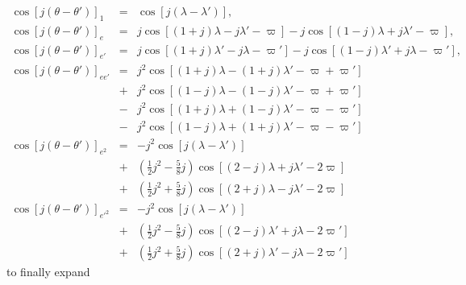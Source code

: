 \documentclass [12pt, a4paper] {article}
\begin{document}
\begin {eqnarray}
    \cos[j(\theta - \theta')]_1 
    &=&
    \cos[j(\lambda - \lambda')],
    \\
    \cos[j(\theta - \theta')]_e 
    &=&
    j\cos[(1+j)\lambda - j\lambda' - \varpi]
    -
    j\cos[(1-j)\lambda + j\lambda' - \varpi],
    \\
    \cos[j(\theta - \theta')]_{e'} 
    &=&
    j\cos[(1 + j)\lambda' - j\lambda - \varpi']
    - 
    j\cos[(1 - j)\lambda' + j\lambda - \varpi'],
    \\
    \cos[j(\theta - \theta')]_{ee'} 
    &=&
    j^2\cos[(1+j)\lambda - (1+j)\lambda' - \varpi + \varpi']
    \\\nonumber
    &+&
    j^2\cos[(1-j)\lambda - (1-j)\lambda' - \varpi + \varpi']
    \\\nonumber 
    &-&
    j^2\cos[(1+j)\lambda + (1-j)\lambda' - \varpi - \varpi']
    \\\nonumber 
    &-&
    j^2\cos[(1-j)\lambda + (1+j)\lambda' - \varpi - \varpi']
    \\
    \cos[j(\theta - \theta')]_{e^2} 
    &=&
    -j^2\cos[j(\lambda - \lambda')]
    \\\nonumber 
    &+&
    \left(\frac{1}{2}j^2 - \frac{5}{8}j\right)\cos[(2-j)\lambda + j\lambda' - 2\varpi]
    \\\nonumber 
    &+&
    \left(\frac{1}{2}j^2 + \frac{5}{8}j\right)\cos[(2+j)\lambda - j\lambda' - 2\varpi]
    \\
    \cos[j(\theta - \theta')]_{e'^2} 
    &=&
    -j^2\cos[j(\lambda - \lambda')]
    \\\nonumber 
    &+&
    \left(\frac{1}{2}j^2 - \frac{5}{8}j\right)\cos[(2-j)\lambda' + j\lambda - 2\varpi']
    \\\nonumber 
    &+&
    \left(\frac{1}{2}j^2 + \frac{5}{8}j\right)\cos[(2+j)\lambda' - j\lambda - 2\varpi']
\end {eqnarray}
to finally expand 
\end{document}
